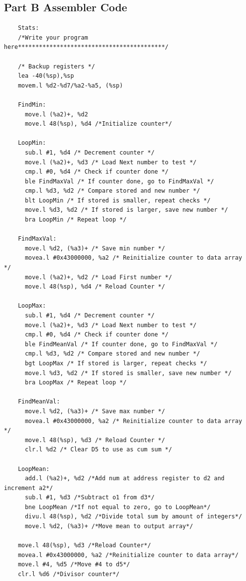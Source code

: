 \documentclass[10pt, letterpaper, titlepage]{article} %
\begin{document}
\newpage

\subsection{Part B Assembler Code}
\begin{lstlisting}
	Stats:
	/*Write your program here******************************************/
	
	/* Backup registers */
	lea -40(%sp),%sp
	movem.l %d2-%d7/%a2-%a5, (%sp)
	
	FindMin:
	  move.l (%a2)+, %d2
	  move.l 48(%sp), %d4 /*Initialize counter*/
	
	LoopMin:
	  sub.l #1, %d4 /* Decrement counter */
	  move.l (%a2)+, %d3 /* Load Next number to test */
	  cmp.l #0, %d4 /* Check if counter done */
	  ble FindMaxVal /* If counter done, go to FindMaxVal */
	  cmp.l %d3, %d2 /* Compare stored and new number */
	  blt LoopMin /* If stored is smaller, repeat checks */
	  move.l %d3, %d2 /* If stored is larger, save new number */
	  bra LoopMin /* Repeat loop */
	
	FindMaxVal:
	  move.l %d2, (%a3)+ /* Save min number */
	  movea.l #0x43000000, %a2 /* Reinitialize counter to data array */
	  move.l (%a2)+, %d2 /* Load First number */
	  move.l 48(%sp), %d4 /* Reload Counter */
	
	LoopMax:
	  sub.l #1, %d4 /* Decrement counter */
	  move.l (%a2)+, %d3 /* Load Next number to test */
	  cmp.l #0, %d4 /* Check if counter done */
	  ble FindMeanVal /* If counter done, go to FindMaxVal */
	  cmp.l %d3, %d2 /* Compare stored and new number */
	  bgt LoopMax /* If stored is larger, repeat checks */
	  move.l %d3, %d2 /* If stored is smaller, save new number */
	  bra LoopMax /* Repeat loop */
	
	FindMeanVal:
	  move.l %d2, (%a3)+ /* Save max number */
	  movea.l #0x43000000, %a2 /* Reinitialize counter to data array */
	  move.l 48(%sp), %d3 /* Reload Counter */
	  clr.l %d2 /* Clear D5 to use as cum sum */
	
	LoopMean:
	  add.l (%a2)+, %d2 /*Add num at address register to d2 and increment a2*/
	  sub.l #1, %d3 /*Subtract o1 from d3*/
	  bne LoopMean /*If not equal to zero, go to LoopMean*/
	  divu.l 48(%sp), %d2 /*Divide total sum by amount of integers*/
	  move.l %d2, (%a3)+ /*Move mean to output array*/
	
	move.l 48(%sp), %d3 /*Reload Counter*/
	movea.l #0x43000000, %a2 /*Reinitialize counter to data array*/
	move.l #4, %d5 /*Move #4 to d5*/
	clr.l %d6 /*Divisor counter*/
	

\end{lstlisting}
\end{document}
